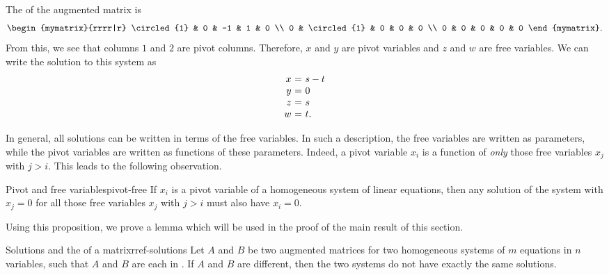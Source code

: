 \begin{solution}
  The {\rref} of the augmented matrix is
  \begin{equation*}
    \begin{mymatrix}{rrrr|r}
      \circled{1} & 0 & -1 & 1 & 0 \\
      0 & \circled{1} & 0 & 0 & 0 \\
      0 & 0 & 0 & 0 & 0
    \end{mymatrix}.
  \end{equation*}
  From this, we see that columns $1$ and $2$ are pivot
  columns. Therefore, $x$ and $y$ are pivot variables and $z$ and $w$
  are free variables. We can write the solution to this system as
  \begin{equation*}
    \begin{array}{r@{~}c@{~}l}
      x &=& s-t \\
      y &=& 0 \\
      z &=& s \\
      w &=& t.
    \end{array}
  \end{equation*}
\end{solution}

In general, all solutions can be written in terms of the free
variables. In such a description, the free variables are written as
parameters, while the pivot variables are written as functions of
these parameters. Indeed, a pivot variable $x_i$ is a function of {\em
  only} those free variables $x_j$ with $j>i$. This leads to the
following observation.

\begin{proposition}{Pivot and free variables}{pivot-free}
  If $x_i$ is a pivot variable of a homogeneous system of linear
  equations, then any solution of the system with $x_j=0$ for all
  those free variables $x_j$ with $j>i$ must also have $x_i=0$.
\end{proposition}

Using this proposition, we prove a lemma which will be used in the
proof of the main result of this section.

\begin{lemma}{Solutions and the {\rref} of a matrix}{rref-solutions}
  Let $A$ and $B$ be two augmented matrices for two homogeneous
  systems of $m$ equations in $n$ variables, such that $A$ and $B$ are
  each in {\rref}. If $A$ and $B$ are different, then the two systems
  do not have exactly the same solutions.
\end{lemma}


